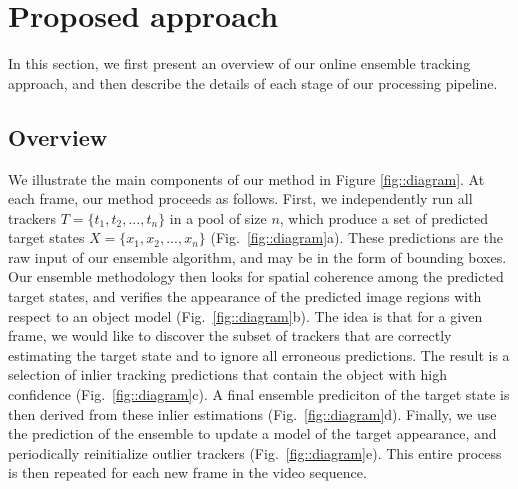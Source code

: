\chapter{Proposed approach} %

\label{chapter2} %


In this section, we first present an overview of our online ensemble
tracking approach, and then describe the details of each stage of our
processing pipeline.

\section{Overview}

We illustrate the main components of our method in
Figure \ref{fig::diagram}.
At each frame, our method proceeds as follows.
First, we independently run all trackers
$T = \{ t_1, t_2, ..., t_n \}$
in a pool of size $n$, which produce a set of predicted target
states
$X = \{ x_1, x_2, ..., x_n \}$ (Fig.~\ref{fig::diagram}a).
These predictions are the raw input of our ensemble algorithm,
and may be in the form of bounding boxes.
Our ensemble methodology then looks for spatial coherence among the predicted
target states, and verifies the appearance of the predicted image regions
with respect to an object model
(Fig.~\ref{fig::diagram}b). The idea is that for a given frame,
we would like to discover the subset of trackers that are correctly
estimating the target state and to ignore all erroneous predictions.
The result is a selection of inlier tracking predictions
that contain the object with high confidence
(Fig.~\ref{fig::diagram}c).
A final ensemble prediciton of the target state is then derived from
these inlier estimations (Fig.~\ref{fig::diagram}d).
Finally, we use the prediction of the ensemble to update a model of the
target appearance, and periodically reinitialize outlier trackers
(Fig.~\ref{fig::diagram}e).
This entire process is then repeated for each new frame in the video sequence.

